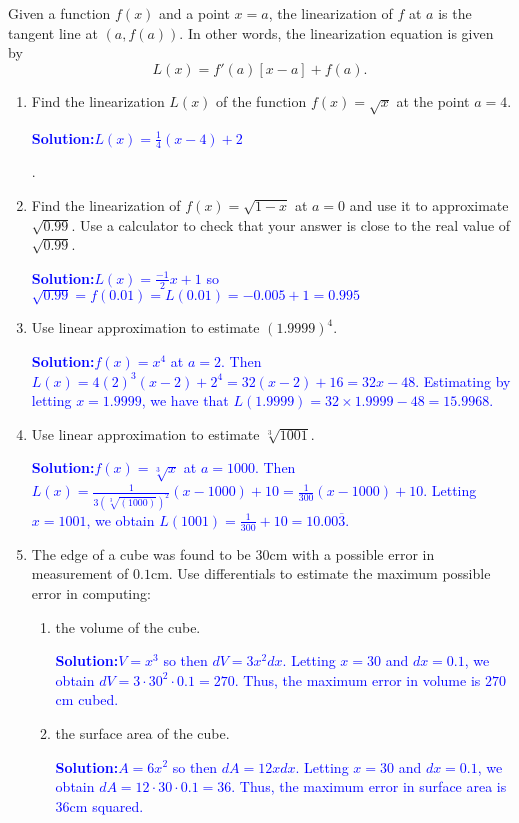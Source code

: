 \documentclass[letterpaper,11pt]{article}
\newcommand{\sol}[2]{\begin{minipage}[c][#1]{\linewidth}{\textcolor{blue}{\textbf{Solution:}}\quad \textcolor{blue}{#2}}\end{minipage}}
\newcommand{\sol}[2]{\begin{minipage}[c][#1]{\linewidth}{\vfill}\end{minipage}}
\begin{document}
Given a function $f(x)$ and a point $x = a$, the linearization of $f$ at $a$ is the tangent line at $(a,f(a))$. In other words, the linearization equation is given by
\[L(x) = f'(a)[x-a] + f(a).\]
\begin{enumerate}
\item Find the linearization $L(x)$ of the function $f(x) = \sqrt{x}$ at the point $a=4$.

\sol{}{$L(x) = \frac{1}{4} (x-4) + 2$}.
\vfill
\item Find the linearization of $f(x) = \sqrt{1-x}$ at $a=0$ and use it to approximate $\sqrt{0.99}$. Use a calculator to check that your answer is close to the real value of $\sqrt{0.99}$.

\sol{}{$L(x) = \frac{-1}{2} x + 1$ so $\sqrt{0.99} = f(0.01) = L(0.01) = -0.005 + 1 = 0.995$}
\vfill
\newpage
\item Use linear approximation to estimate $(1.9999)^4.$

\sol{}{$f(x) = x^4$ at $a=2$. Then $L(x) = 4(2)^3(x-2) + 2^4 = 32(x-2) + 16 = 32x - 48$. Estimating by letting $x=1.9999$, we have that $L(1.9999) = 32\times 1.9999 - 48 = 15.9968$.}
\vfill
\item Use linear approximation to estimate $\sqrt[3]{1001}$.

\sol{}{$f(x) = \sqrt[3]{x}$ at $a=1000$. Then $L(x) = \frac{1}{3(\sqrt[3]{(1000)})^2} (x-1000)+ 10 = \frac{1}{300} (x-1000) + 10$. Letting $x = 1001$, we obtain $L(1001) = \frac{1}{300} + 10 = 10.00\overline{3}$.} 
\vfill

\newpage
\item The edge of a cube was found to be $30$cm with a possible error in measurement of $0.1$cm. Use differentials to estimate the maximum possible error in computing:
\begin{enumerate}
    \item the volume of the cube.

    \sol{}{$V = x^3$ so then $dV = 3x^2 dx$. Letting $x = 30$ and $dx = 0.1$, we obtain $dV = 3\cdot 30^2 \cdot 0.1= 270$. Thus, the maximum error in volume is $270$cm cubed.}
    \vfill
    \item the surface area of the cube.

    \sol{}{$A = 6x^2$ so then $dA = 12x dx$. Letting $x=30$ and $dx=  0.1$, we obtain $dA = 12\cdot 30\cdot 0.1 = 36$. Thus, the maximum error in surface area is $36$cm squared.}
    \vfill
\end{enumerate}
\end{enumerate}
\end{document}
